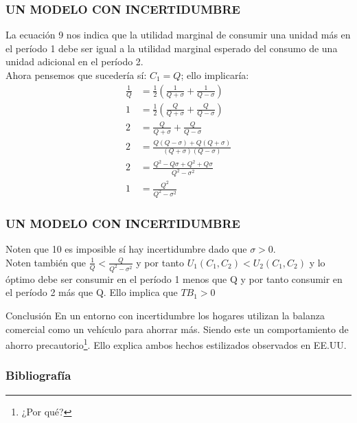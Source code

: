 \documentclass[10pt, xcolor=table, x11names]{beamer}
\begin{document}
\begin{frame}[label=7]
	\frametitle{{\normalsize  UN MODELO CON INCERTIDUMBRE} {}}
	La ecuación 9 nos indica que la utilidad marginal de consumir una unidad más en el período 1 debe ser igual a la utilidad marginal esperado del consumo de una unidad adicional en el período 2.\\
	Ahora pensemos que sucedería sí: $C_{1}=Q $; ello implicaría:
\begin{align}
\frac{1}{Q}&=\frac{1}{2}(\frac{1}{Q+\sigma}+\frac{1}{Q-\sigma})\nonumber \\
1&=\frac{1}{2}(\frac{Q}{Q+\sigma}+\frac{Q}{Q-\sigma})\nonumber \\
2&=\frac{Q}{Q+\sigma}+\frac{Q}{Q-\sigma}\nonumber \\
2&=\frac{Q(Q-\sigma)+Q(Q+\sigma)}{(Q+\sigma)(Q-\sigma)}\nonumber \\
2&=\frac{Q^{2}-Q\sigma+Q^{2}+Q\sigma}{Q^{2}-\sigma^{2}}\nonumber \\
1&=\frac{Q^{2}}{Q^{2}-\sigma^{2}}
\end{align}	
	
	
	
\end{frame}
\begin{frame}[label=8]
	\frametitle{{\normalsize  UN MODELO CON INCERTIDUMBRE} {}}
	Noten que 10 es imposible sí hay incertidumbre dado que $\sigma>0 $.\\
	Noten también que $\frac{1}{Q}<\frac{Q}{Q^{2}-\sigma^{2}} $ y por tanto 
	$U_{1}(C_{1},C_{2})<U_{2}(C_{1},C_{2}) $ y lo óptimo debe ser consumir en el período 1 menos que Q y por tanto consumir en el período 2 más que Q. Ello implica que $TB_{1}>0$\\
	
	\begin{block} {Conclusión}
		En un entorno con incertidumbre los hogares utilizan la balanza comercial como un vehículo para ahorrar más. Siendo este un comportamiento de ahorro precautorio\footnote{¿Por qué?}. Ello explica ambos hechos estilizados observados en EE.UU.
	\end{block}	
	
	  
	
	
\end{frame}

	\begin{frame}
		\frametitle{{\large 
				Bibliografía}}
		\renewcommand{\refname}{Referencias}
		
		
	\end{frame}
\end{document}
